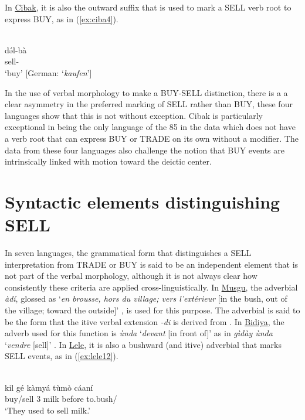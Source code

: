 In \hyperref[ciba]{Cibak}, it is also the outward suffix that is used to mark a SELL verb root to express BUY, as in (\ref{ex:ciba4}). 

\ea\label{ex:ciba4}
 \\
\gll də́l-bà \\
sell- \\
\glt `buy' [German: `\textit{kaufen}']
\z 

In the use of verbal morphology to make a BUY-SELL distinction, there is a a clear asymmetry in the preferred marking of SELL rather than BUY, these four languages show that this is not without exception. Cibak is particularly exceptional in being the only language of the 85 in the data which does not have a verb root that can express BUY or TRADE on its own without a modifier. The data from these four languages also challenge the notion that BUY events are intrinsically linked with motion toward the deictic center. 

\section{Syntactic elements distinguishing SELL}  \label{sec:SELLsyntax}

In seven languages, the grammatical form that distinguishes a SELL interpretation from TRADE or BUY is said to be an independent element that is not part of the verbal morphology, although it is not always clear how consistently these criteria are applied cross-linguistically. In \hyperref[musg]{Musgu}, the adverbial \textit{àdí}, glossed as `\textit{en brousse, hors du village; vers l'extérieur} [in the bush, out of the village; toward the outside]' \citep[71]{tourneuxLexiquePratiqueMunjuk1991}, is used for this purpose. The adverbial is said to be the form that the itive verbal extension \textit{-di} is derived from \citep[133--134]{meyer-bahlburgStudienZurMorphologie1972}. In \hyperref[bidi]{Bidiya}, the adverb used for this function is \textit{ùnda} `\textit{devant} [in front of]' as in \textit{gìdày ùnda} `\textit{vendre} [sell]' \citep[78]{alioLexiqueBidiya1989}. In \hyperref[lele]{Lele}, it is also a bushward (and itive) adverbial that marks SELL events, as in (\ref{ex:lele12}). 

\ea\label{ex:lele12}
 \\
\gll kil	gé	kàmyá	tùmò	cáaní \\
buy/sell	3	milk	before	to.bush/ \\
\glt `They used to sell milk.'
\z

